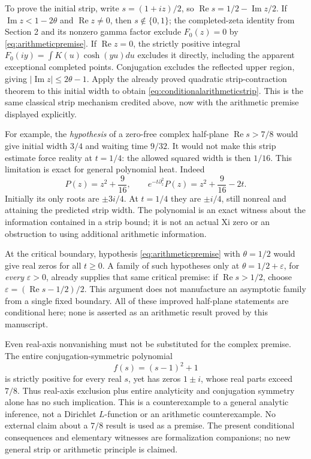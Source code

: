 \documentclass[11pt]{article}
\begin{document}
To prove the initial strip, write
$s=(1+iz)/2$, so $\operatorname{Re}s=1/2-\operatorname{Im}z/2$.
If $\operatorname{Im}z<1-2\theta$ and $\operatorname{Re}z\ne0$,
then $s\notin\{0,1\}$; the completed-zeta identity from Section 2
and its nonzero gamma factor exclude $F_0(z)=0$ by
\eqref{eq:arithmeticpremise}. If $\operatorname{Re}z=0$, the
strictly positive integral $F_0(iy)=\int K(u)\cosh(yu)du$ excludes
it directly, including the apparent exceptional completed points.
Conjugation excludes the reflected upper region, giving
$|\operatorname{Im}z|\leq2\theta-1$.
Apply the already proved quadratic strip-contraction theorem to this
initial width to obtain \eqref{eq:conditionalarithmeticstrip}.
This is the same classical strip mechanism credited above, now
with the arithmetic premise displayed explicitly.

For example, the \emph{hypothesis} of a zero-free complex half-plane
$\operatorname{Re}s>7/8$ would give initial width $3/4$ and waiting
time $9/32$. It would not make this strip estimate force reality
at $t=1/4$: the allowed squared width is then $1/16$.
This limitation is exact for general polynomial heat. Indeed
\[
 P(z)=z^2+\frac9{16},\qquad
 e^{-t\partial_z^2}P(z)=z^2+\frac9{16}-2t.
\]
Initially its only roots are $\pm3i/4$. At $t=1/4$ they are
$\pm i/4$, still nonreal and attaining the predicted strip width.
The polynomial is an exact witness about the information contained
in a strip bound; it is not an actual Xi zero or an obstruction
to using additional arithmetic information.

At the critical boundary, hypothesis
\eqref{eq:arithmeticpremise} with $\theta=1/2$ would give real
zeros for all $t\geq0$. A family of such hypotheses only at
$\theta=1/2+\varepsilon$, for \emph{every} $\varepsilon>0$,
already supplies that same critical premise: if
$\operatorname{Re}s>1/2$, choose
$\varepsilon=(\operatorname{Re}s-1/2)/2$.
This argument does not manufacture an asymptotic family from a
single fixed boundary. All of these improved half-plane statements
are conditional here; none is asserted as an arithmetic result
proved by this manuscript.

Even real-axis nonvanishing must not be substituted for the complex
premise. The entire conjugation-symmetric polynomial
\[
 f(s)=(s-1)^2+1
\]
is strictly positive for every real $s$, yet has zeros $1\pm i$,
whose real parts exceed $7/8$. Thus real-axis exclusion plus entire
analyticity and conjugation symmetry alone has no such implication.
This is a counterexample to a general analytic inference, not a
Dirichlet $L$-function or an arithmetic counterexample. No external
claim about a $7/8$ result is used as a premise. The present
conditional consequences and elementary witnesses are formalization
companions; no new general strip or arithmetic principle is claimed.
\end{document}
